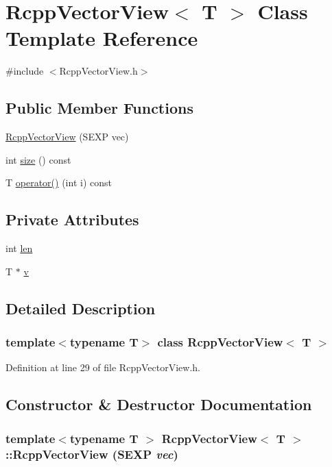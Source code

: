 \hypertarget{classRcppVectorView}{
\section{RcppVectorView$<$ T $>$ Class Template Reference}
\label{classRcppVectorView}
}


{\ttfamily \#include $<$RcppVectorView.h$>$}\subsection*{Public Member Functions}
\begin{DoxyCompactItemize}
\item 
\hyperlink{classRcppVectorView_ad2e90fed8ee8a40f56591cc94f83041e}{RcppVectorView} (SEXP vec)
\item 
int \hyperlink{classRcppVectorView_ad4c0f21296eb1cf7b2e2c8b8b43f4b0d}{size} () const 
\item 
T \hyperlink{classRcppVectorView_a13d63e990363a37ae29e0eab7400d297}{operator()} (int i) const 
\end{DoxyCompactItemize}
\subsection*{Private Attributes}
\begin{DoxyCompactItemize}
\item 
int \hyperlink{classRcppVectorView_ada67f9b1481099e4a820deaf4648778b}{len}
\item 
T $\ast$ \hyperlink{classRcppVectorView_ae3dc3546d0dd0e3de95800b7c91857e8}{v}
\end{DoxyCompactItemize}


\subsection{Detailed Description}
\subsubsection*{template$<$typename T$>$ class RcppVectorView$<$ T $>$}



Definition at line 29 of file RcppVectorView.h.

\subsection{Constructor \& Destructor Documentation}
\hypertarget{classRcppVectorView_ad2e90fed8ee8a40f56591cc94f83041e}{
\subsubsection[{RcppVectorView}]{\setlength{\rightskip}{0pt plus 5cm}template$<$typename T $>$ {\bf RcppVectorView}$<$ T $>$::{\bf RcppVectorView} (SEXP {\em vec})}}
\label{classRcppVectorView_ad2e90fed8ee8a40f56591cc94f83041e}


